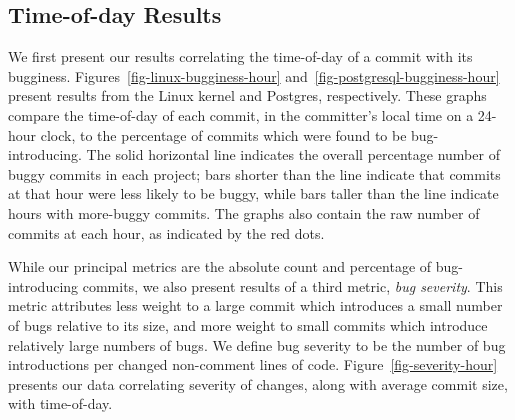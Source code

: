 

\subsection{Time-of-day Results} 
\label{sec-time-of-day}
We first present our results correlating the time-of-day of a commit
with its bugginess.  
Figures~\ref{fig-linux-bugginess-hour}
and~\ref{fig-postgresql-bugginess-hour} present results from the Linux kernel and
Postgres, respectively. These graphs compare the time-of-day of each
commit, in the committer's local time on a 24-hour clock, to the
percentage of commits which were found to be bug-introducing. The
solid horizontal line indicates the overall percentage number of buggy commits in
each project; bars shorter than the line indicate that commits at that
hour were less likely to be buggy, while bars taller than the line
indicate hours with more-buggy commits. The graphs also contain the
raw number of commits at each hour, as indicated by the red dots.

While our principal metrics are the absolute count and percentage of
bug-introducing commits, we also present results of a third metric,
\emph{bug severity}. This metric attributes less weight to a large
commit which introduces a small number of bugs relative to its size,
and more weight to small commits which introduce relatively large
numbers of bugs. We define bug severity to be the number of bug
introductions per changed non-comment lines of
code. Figure~\ref{fig-severity-hour} presents our data correlating
severity of changes, along with average commit size, with time-of-day.


